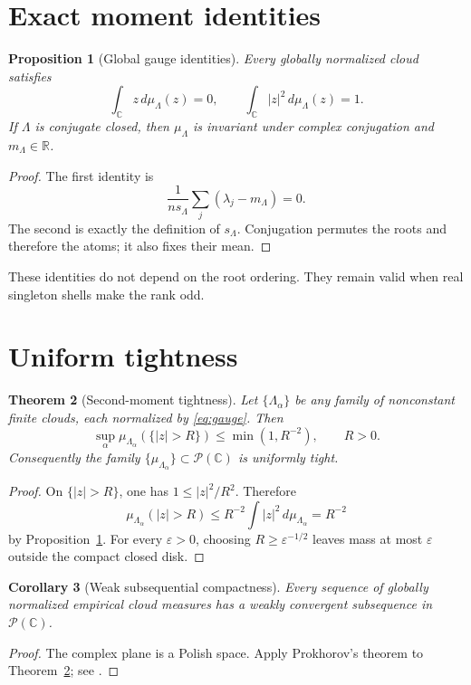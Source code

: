 \documentclass[11pt]{article}
\newtheorem{theorem}{Theorem}[section]
\newtheorem{proposition}[theorem]{Proposition}
\newtheorem{corollary}[theorem]{Corollary}
\theoremstyle{remark}\newtheorem{remark}[theorem]{Remark}
\newcommand{\C}{\mathbb C}
\newcommand{\Prob}{\mathcal P}
\begin{document}
\section{Exact moment identities}

\begin{proposition}[Global gauge identities]\label{prop:moments}
Every globally normalized cloud satisfies
\begin{equation}\label{eq:identities}
 \int_\C z\,d\mu_\Lambda(z)=0,\qquad
 \int_\C |z|^2\,d\mu_\Lambda(z)=1.
\end{equation}
If $\Lambda$ is conjugate closed, then $\mu_\Lambda$ is invariant under
complex conjugation and $m_\Lambda\in\mathbb R$.
\end{proposition}
\begin{proof}
The first identity is
\[
 \frac1{ns_\Lambda}\sum_j(\lambda_j-m_\Lambda)=0.
\]
The second is exactly the definition of $s_\Lambda$. Conjugation permutes
the roots and therefore the atoms; it also fixes their mean.
\end{proof}

These identities do not depend on the root ordering. They remain valid when
real singleton shells make the rank odd.

\section{Uniform tightness}

\begin{theorem}[Second-moment tightness]\label{thm:tight}
Let $\{\Lambda_\alpha\}$ be any family of nonconstant finite clouds, each
normalized by \eqref{eq:gauge}. Then
\begin{equation}\label{eq:tail}
 \sup_\alpha\mu_{\Lambda_\alpha}(\{|z|>R\})
 \le \min(1,R^{-2}),\qquad R>0.
\end{equation}
Consequently the family
$\{\mu_{\Lambda_\alpha}\}\subset\Prob(\C)$ is uniformly tight.
\end{theorem}
\begin{proof}
On $\{|z|>R\}$, one has $1\le |z|^2/R^2$. Therefore
\[
 \mu_{\Lambda_\alpha}(|z|>R)
 \le R^{-2}\int |z|^2\,d\mu_{\Lambda_\alpha}=R^{-2}
\]
by Proposition~\ref{prop:moments}. For every $\varepsilon>0$, choosing
$R\ge\varepsilon^{-1/2}$ leaves mass at most $\varepsilon$ outside the compact
closed disk.
\end{proof}

\begin{corollary}[Weak subsequential compactness]\label{cor:prok}
Every sequence of globally normalized empirical cloud measures has a weakly
convergent subsequence in $\Prob(\C)$.
\end{corollary}
\begin{proof}
The complex plane is a Polish space. Apply Prokhorov's theorem to
Theorem~\ref{thm:tight}; see \citet{Billingsley1999}.
\end{proof}
\end{document}
